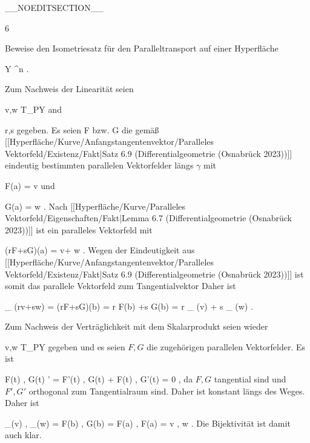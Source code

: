 __NOEDITSECTION__

{6}

{

Beweise den Isometriesatz für den Paralleltransport auf einer Hyperfläche

\mavergleichskette
{\vergleichskette
{ Y
}
{ \subseteq }{ \R^n
}
{  }{
}
{    }{
}
{   }{
}
}
{}{}{.}

}
{

Zum Nachweis der Linearität seien

\mavergleichskette
{\vergleichskette
{ v,w
}
{ \in }{ T_PY
}
{  }{
}
{    }{
}
{   }{
}
}
{}{}{}
and

\mavergleichskette
{\vergleichskette
{ r,s
}
{ \in }{ \R
}
{  }{
}
{    }{
}
{   }{
}
}
{}{}{}
gegeben. Es seien
\mathkor {} {F} {bzw.} {G} {}
die gemäß
[[Hyperfläche/Kurve/Anfangstangentenvektor/Paralleles Vektorfeld/Existenz/Fakt|Satz 6.9 (Differentialgeometrie (Osnabrück 2023))]]
eindeutig bestimmten parallelen Vektorfelder längs $\gamma$ mit

\mavergleichskette
{\vergleichskette
{ F(a)
}
{ = }{ v
}
{  }{
}
{    }{
}
{   }{
}
}
{}{}{}
und

\mavergleichskette
{\vergleichskette
{ G(a)
}
{ = }{ w
}
{  }{
}
{    }{
}
{   }{
}
}
{}{}{.}
Nach
[[Hyperfläche/Kurve/Paralleles Vektorfeld/Eigenschaften/Fakt|Lemma 6.7 (Differentialgeometrie (Osnabrück 2023))]]
ist
 ein paralleles Vektorfeld mit

\mavergleichskette
{\vergleichskette
{ (rF+sG)(a)
}
{ = }{ v+ w
}
{  }{
}
{    }{
}
{   }{
}
}
{}{}{.}
Wegen der Eindeutigkeit aus
[[Hyperfläche/Kurve/Anfangstangentenvektor/Paralleles Vektorfeld/Existenz/Fakt|Satz 6.9 (Differentialgeometrie (Osnabrück 2023))]]
ist somit
 das parallele Vektorfeld zum Tangentialvektor
 Daher ist

\mavergleichskettedisp
{\vergleichskette
{ \Psi_{\gamma} (rv+sw)
}
{ =} { (rF+sG)(b)
}
{ =} { r F(b) +s G(b)
}
{ =} { r \Psi_{\gamma} (v) + s \Psi_{\gamma} (w)
}
{ } {
}
}
{}{}{.}

Zum Nachweis der Verträglichkeit mit dem Skalarprodukt seien wieder

\mavergleichskette
{\vergleichskette
{ v,w
}
{ \in }{ T_PY
}
{  }{
}
{    }{
}
{   }{
}
}
{}{}{}
gegeben und es seien $F,G$ die zugehörigen parallelen Vektorfelder. Es ist

\mavergleichskettedisp
{\vergleichskette
{ \left\langle  F(t) , G(t)  \right\rangle'
}
{ =} { \left\langle  F'(t) , G(t)  \right\rangle  +  \left\langle  F(t) , G'(t)  \right\rangle
}
{ =} { 0
}
{ } {
}
{ } {
}
}
{}{}{,}
da $F,G$ tangential sind und $F',G'$ orthogonal zum Tangentialraum sind. Daher ist
 konstant längs des Weges. Daher ist

\mavergleichskettedisp
{\vergleichskette
{ \left\langle \Psi_\gamma(v)  , \Psi_\gamma(w)  \right\rangle
}
{ =} { \left\langle  F(b)  ,  G(b)   \right\rangle
}
{ =} { \left\langle  F(a)  ,  F(a)   \right\rangle
}
{ =} { \left\langle  v  , w  \right\rangle
}
{ } {
}
}
{}{}{.}
Die Bijektivität ist damit auch klar.

 }

